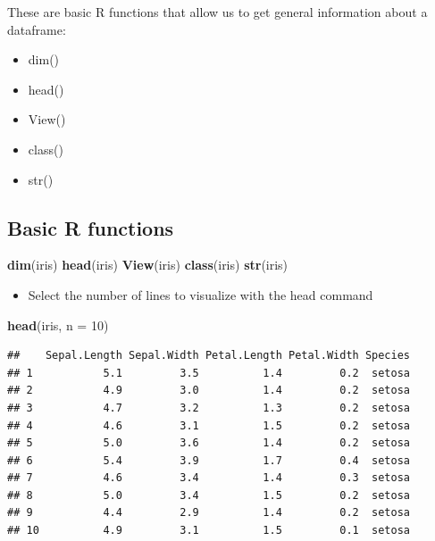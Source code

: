 \documentclass[
]{book}
\newenvironment{Shaded}{\begin{snugshade}}{\end{snugshade}}
\newcommand{\AttributeTok}[1]{\textcolor[rgb]{0.13,0.29,0.53}{#1}}
\newcommand{\DecValTok}[1]{\textcolor[rgb]{0.00,0.00,0.81}{#1}}
\newcommand{\FunctionTok}[1]{\textcolor[rgb]{0.13,0.29,0.53}{\textbf{#1}}}
\newcommand{\NormalTok}[1]{#1}
\providecommand{\tightlist}{%
  \setlength{\itemsep}{0pt}\setlength{\parskip}{0pt}}
\begin{document}
These are basic R functions that allow us to get general information about a dataframe:

\begin{itemize}
\tightlist
\item
  dim()
\item
  head()
\item
  View()
\item
  class()
\item
  str()
\end{itemize}

\subsection{Basic R functions}\label{basic-r-functions}

\begin{Shaded}
\begin{Highlighting}[]
\FunctionTok{dim}\NormalTok{(iris)}
\FunctionTok{head}\NormalTok{(iris)}
\FunctionTok{View}\NormalTok{(iris)}
\FunctionTok{class}\NormalTok{(iris)}
\FunctionTok{str}\NormalTok{(iris)}
\end{Highlighting}
\end{Shaded}

\begin{itemize}
\tightlist
\item
  Select the number of lines to visualize with the head command
\end{itemize}

\begin{Shaded}
\begin{Highlighting}[]
\FunctionTok{head}\NormalTok{(iris, }\AttributeTok{n =} \DecValTok{10}\NormalTok{)}
\end{Highlighting}
\end{Shaded}

\begin{verbatim}
##    Sepal.Length Sepal.Width Petal.Length Petal.Width Species
## 1           5.1         3.5          1.4         0.2  setosa
## 2           4.9         3.0          1.4         0.2  setosa
## 3           4.7         3.2          1.3         0.2  setosa
## 4           4.6         3.1          1.5         0.2  setosa
## 5           5.0         3.6          1.4         0.2  setosa
## 6           5.4         3.9          1.7         0.4  setosa
## 7           4.6         3.4          1.4         0.3  setosa
## 8           5.0         3.4          1.5         0.2  setosa
## 9           4.4         2.9          1.4         0.2  setosa
## 10          4.9         3.1          1.5         0.1  setosa
\end{verbatim}
\end{document}
